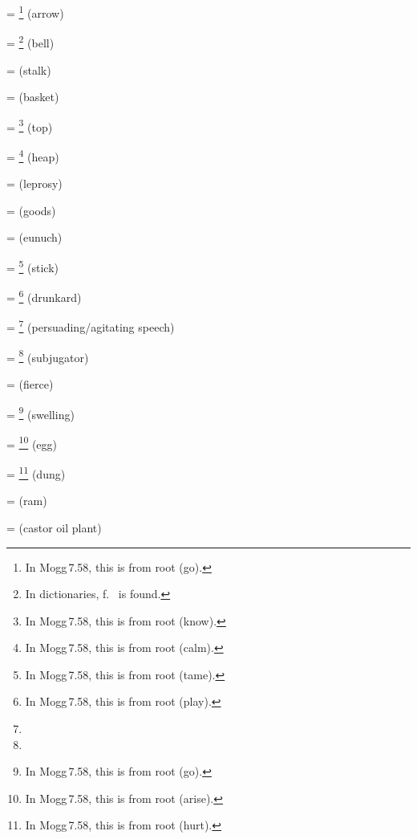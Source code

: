  = \footnote{In Mogg\,7.58, this is from root  (go).} (arrow)\par
{} = \footnote{In dictionaries, f.\  is found.} (bell)\par
{} =  (stalk)\par
{} =  (basket)\par
{} = \footnote{In Mogg\,7.58, this is from root  (know).} (top)\par
{} = \footnote{In Mogg\,7.58, this is from root  (calm).} (heap)\par
{} =  (leprosy)\par
{} =  (goods)\par
{} =  (eunuch)\par
{} = \footnote{In Mogg\,7.58, this is from root  (tame).} (stick)\par
{} = \footnote{In Mogg\,7.58, this is from root  (play).} (drunkard)\par
{} = \footnote{} (persuading/agitating speech)\par
{} = \footnote{} (subjugator)\par
{} =  (fierce)\par
{} = \footnote{In Mogg\,7.58, this is from root  (go).} (swelling)\par
{} = \footnote{In Mogg\,7.58, this is from root  (arise).} (egg)\par
{} = \footnote{In Mogg\,7.58, this is from root  (hurt).} (dung)\par
{} =  (ram)\par
{} =  (castor oil plant)\par
